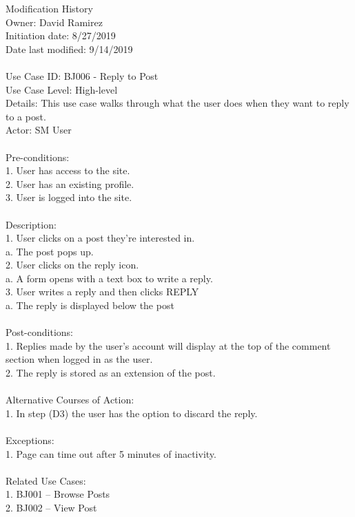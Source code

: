 \documentclass{report}
\begin{document}
Modification History\\
     Owner: David Ramirez\\
     Initiation date: 8/27/2019\\
     Date last modified: 9/14/2019\\
\\
Use Case ID: BJ006 - Reply to Post\\
Use Case Level: High-level\\
Details: This use case walks through what the user does when they want to reply to a post.\\
Actor: SM User\\
\\
Pre-conditions: \\
1.	User has access to the site.\\
2.	User has an existing profile.\\
3.	User is logged into the site.\\
\\
Description: \\
1.	User clicks on a post they’re interested in. \\
	a.	The post pops up.\\
2.	User clicks on the reply icon. \\
	a.	A form opens with a text box to write a reply.\\
3.	User writes a reply and then clicks REPLY\\
	a.	The reply is displayed below the post   \\
\\
Post-conditions: \\
1.	Replies made by the user’s account will display at the top of the comment section when logged in as the user.\\
2.	The reply is stored as an extension of the post.\\
\\
Alternative Courses of Action:\\
1.	In step (D3) the user has the option to discard the reply.\\
\\
Exceptions: \\
1.	Page can time out after 5 minutes of inactivity.\\
\\
Related Use Cases: \\
1.	BJ001 – Browse Posts\\
2.	BJ002 – View Post\\
\\
\end{document}

